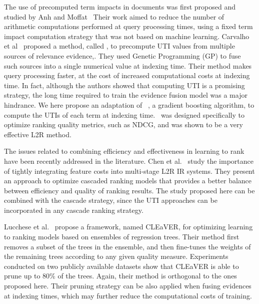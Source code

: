 \documentclass[preprint,review,10pt,3p]{elsarticle}
\begin{document}
The use of precomputed term impacts in documents was first proposed and studied by Anh and Moffat~\cite{Anh:2002:ITE:564376.564380}
Their work aimed to reduce the number of arithmetic computations performed at query processing times, using a fixed term impact computation strategy that was not based on machine learning. Carvalho et al~\cite{costa2012lepref} proposed a method, called \lepref, to precompute UTI values from multiple sources of relevance evidence,. They used Genetic Programming (GP)
 to fuse such sources into a single numerical value at indexing time.
Their method makes query processing faster, at the cost of increased computational costs at indexing time. In fact, although the authors showed that computing UTI is a promising strategy, the long time required to train the evidence fusion model was a major hindrance. We here propose an adaptation of \lambdamart~\cite{wu2010lambdamart}, a gradient boosting algorithm, to compute the UTIs of each term at indexing time. \lambdamart\ was designed specifically to optimize ranking quality metrics, such as NDCG, and was shown to be a very effective L2R method. 

The issues related to combining efficiency and effectiveness in learning to rank have been recently addressed in the literature. Chen et al.~\cite{Chen2017} study  the importance of tightly integrating feature costs into multi-stage L2R IR systems. They present an approach to optimize cascaded ranking models that provides a better balance between efficiency and quality of ranking results.  The study proposed here can be combined with the cascade strategy, since the UTI approaches can be incorporated in any cascade ranking strategy.

Lucchese et al.~\cite{Lucchese2016}  propose a  framework, named CLEaVER, for optimizing learning to ranking models based on ensembles of regression trees.  Their method first removes a subset of the trees in the ensemble, and then fine-tunes the weights of the remaining trees according to any given quality measure. Experiments conducted on two publicly available  datasets show that CLEaVER is able to prune up to 80\% of the trees. Again, their method is orthogonal to the ones proposed here. Their pruning strategy can be also applied when fusing evidences at indexing times, which may further reduce the computational costs of training. 
\end{document}
